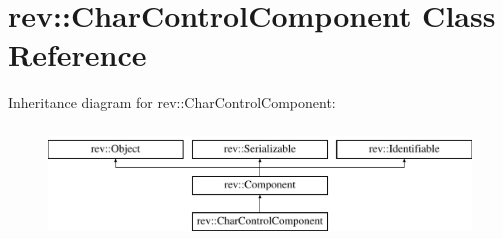 \hypertarget{classrev_1_1_char_control_component}{}\section{rev\+::Char\+Control\+Component Class Reference}
\label{classrev_1_1_char_control_component}
Inheritance diagram for rev\+::Char\+Control\+Component\+:\begin{figure}[H]
\begin{center}
\leavevmode
\includegraphics[height=3.000000cm]{classrev_1_1_char_control_component}
\end{center}
\end{figure}
